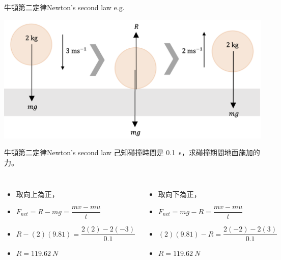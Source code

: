 \documentclass[beamer=true]{standalone}
\begin{document}
\begin{frame}{牛頓第二定律Newton's second law}
    e.g.
        {\par\centering
            \includegraphics[width=.8\textwidth]{assets/16fb42f7.png}
            \par}



\end{frame}
\begin{frame}{牛頓第二定律Newton's second law}
    己知碰撞時間是 \qty{0.1}{s}，求碰撞期間地面施加的力。\medskip
    \begin{columns}
        \begin{itemize}
            \setlength{\itemsep}{0.6em}
            \item 取向上為正，
            \item []$F_{net}=R-mg = \dfrac{mv-mu}{t}$
            \item []$R-(2)(9.81)=\dfrac{2(2)-2(-3)}{0.1}$
            \item [] $R=\qty{119.62}{N}$
        \end{itemize}
        \begin{itemize}
            \setlength{\itemsep}{0.6em}
            \item 取向下為正，
            \item []$F_{net}=mg-R = \dfrac{mv-mu}{t}$
            \item []$(2)(9.81)-R=\dfrac{2(-2)-2(3)}{0.1}$
            \item [] $R=\qty{119.62}{N}$
        \end{itemize}

    \end{columns}
\end{frame}
\end{document}
